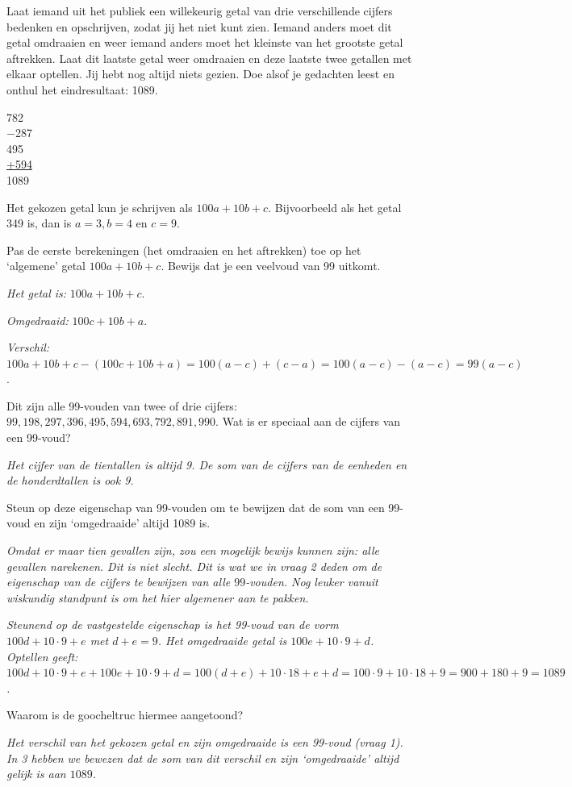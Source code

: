 
Laat iemand uit het publiek een willekeurig getal van drie verschillende cijfers bedenken en opschrijven, zodat jij het niet kunt zien. Iemand anders moet dit getal omdraaien en weer iemand anders moet het kleinste van het grootste getal aftrekken. Laat dit laatste getal weer omdraaien en deze laatste twee getallen met elkaar optellen. Jij hebt nog altijd niets gezien. Doe alsof je gedachten leest en onthul het eindresultaat: 1089.

\begin{center}
782\\
$-$287\:\:\,\\
495\\
\underline{+594}\:\:\,\\
1089
\end{center}
Het gekozen getal kun je schrijven als $100a+10b+c$. Bijvoorbeeld als het getal 349 is, dan is $a=3, b=4$ en $c=9$.
\begin{werktekstoef}
\item{Pas de eerste berekeningen (het omdraaien en het aftrekken) toe op het ‘algemene’ getal $100a+10b+c$. Bewijs dat je een veelvoud van 99 uitkomt.}

\emph{Het getal is:} 		$100a+10b+c$.

\emph{Omgedraaid:}	$100c+10b+a$.

\emph{Verschil:}		$100a+10b+c-(100c+10b+a)=100(a-c)+(c-a)=100(a-c)-(a-c)=99(a-c)$.
\item{Dit zijn alle 99-vouden van twee of drie cijfers: $99, 198, 297, 396, 495, 594, 693, 792, 891, 990$. Wat is er speciaal aan de cijfers van een 99-voud?}

\emph{Het cijfer van de tientallen is altijd 9. De som van de cijfers van de eenheden en de honderdtallen is ook 9.}

\item{Steun op deze eigenschap van 99-vouden om te bewijzen dat de som van een 99-voud en zijn ‘omgedraaide’ altijd 1089 is.}

\emph{Omdat er maar tien gevallen zijn, zou een mogelijk bewijs kunnen zijn: alle gevallen narekenen. Dit is niet slecht. Dit is wat we in vraag 2 deden om de eigenschap van de cijfers te bewijzen van \emph{alle} $99$-vouden. Nog leuker vanuit wiskundig standpunt is om het hier algemener aan te pakken.}

\emph{Steunend op de vastgestelde eigenschap is het 99-voud van de vorm $100d+10\cdot 9+e$ met $d+e=9$. Het omgedraaide getal is $100e+10\cdot 9+d$. Optellen geeft:
$100d+10\cdot 9+e+100e+10\cdot 9+d=100(d+e)+10\cdot 18+e+d=100\cdot 9+10\cdot 18+9=900+180+9=1089$.}

\item{Waarom is de goocheltruc hiermee aangetoond?}

\emph{Het verschil van het gekozen getal en zijn omgedraaide is een 99-voud (vraag 1). In 3 hebben we bewezen dat de som van dit verschil en zijn ‘omgedraaide’ altijd gelijk is aan $1089$.}
\end{werktekstoef}
\eindewerktekst

